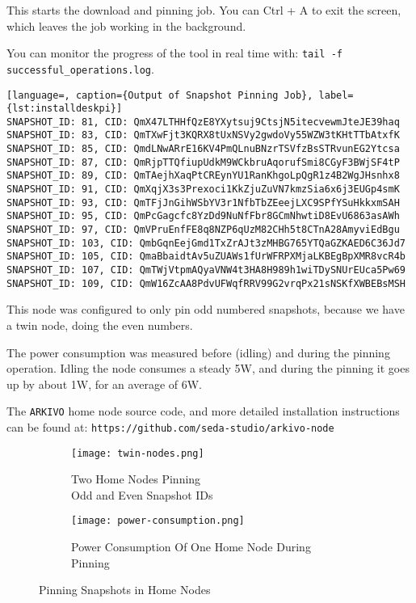 This starts the download and pinning job. You can Ctrl + A to exit the screen, which leaves the job working in the background.

You can monitor the progress of the tool in real time with: \texttt{tail -f successful\_operations.log}.

\begin{lstlisting}[language=, caption={Output of Snapshot Pinning Job}, label={lst:installdeskpi}] 
SNAPSHOT_ID: 81, CID: QmX47LTHHfQzE8YXytsuj9CtsjN5itecvewmJteJE39haq
SNAPSHOT_ID: 83, CID: QmTXwFjt3KQRX8tUxNSVy2gwdoVy55WZW3tKHtTTbAtxfK
SNAPSHOT_ID: 85, CID: QmdLNwARrE16KV4PmQLnuBNzrTSVfzBsSTRvunEG2Ytcsa
SNAPSHOT_ID: 87, CID: QmRjpTTQfiupUdkM9WCkbruAqorufSmi8CGyF3BWjSF4tP
SNAPSHOT_ID: 89, CID: QmTAejhXaqPtCREynYU1RanKhgoLpQgR1z4B2WgJHsnhx8
SNAPSHOT_ID: 91, CID: QmXqjX3s3Prexoci1KkZjuZuVN7kmzSia6x6j3EUGp4smK
SNAPSHOT_ID: 93, CID: QmTFjJnGihWSbYV3r1NfbTbZEeejLXC9SPfYSuHkkxmSAH
SNAPSHOT_ID: 95, CID: QmPcGagcfc8YzDd9NuNfFbr8GCmNhwtiD8EvU6863asAWh
SNAPSHOT_ID: 97, CID: QmVPruEnfFE8q8NZP6qUzM82CHh5t8CTnA28AmyviEdBgu
SNAPSHOT_ID: 103, CID: QmbGqnEejGmd1TxZrAJt3zMHBG765YTQaGZKAED6C36Jd7
SNAPSHOT_ID: 105, CID: QmaBbaidtAv5uZUAWs1fUrWFRPXMjaLKBEgBpXMR8vcR4b
SNAPSHOT_ID: 107, CID: QmTWjVtpmAQyaVNW4t3HA8H989h1wiTDySNUrEUca5Pw69
SNAPSHOT_ID: 109, CID: QmW16ZcAA8PdvUFWqfRRV99G2vrqPx21sNSKfXWBEBsMSH
\end{lstlisting}

This node was configured to only pin odd numbered snapshots, because we have a twin node, doing the even numbers.

The power consumption was measured before (idling) and during the pinning operation. Idling the node consumes a steady 5W, and during the pinning it goes up by about 1W, for an average of 6W.

The \texttt{ARKIVO} home node source code, and more detailed installation instructions can be found at: \texttt{https://github.com/seda-studio/arkivo-node}

\begin{figure}[H]
  \centering
  \begin{subfigure}[b]{0.45\textwidth}
    \centering
    \texttt{[image: twin-nodes.png]}
    \caption{Two Home Nodes Pinning \\ Odd and Even Snapshot IDs}
    \label{fig:twin-nodes}
  \end{subfigure}
  \hfill
  \begin{subfigure}[b]{0.45\textwidth}
    \centering
    \texttt{[image: power-consumption.png]}
    \caption{Power Consumption Of One Home Node During Pinning}
    \label{fig:power-consumption.png}
  \end{subfigure}
  \caption{Pinning Snapshots in Home Nodes}
  \label{fig:pinning-home}
\end{figure}

